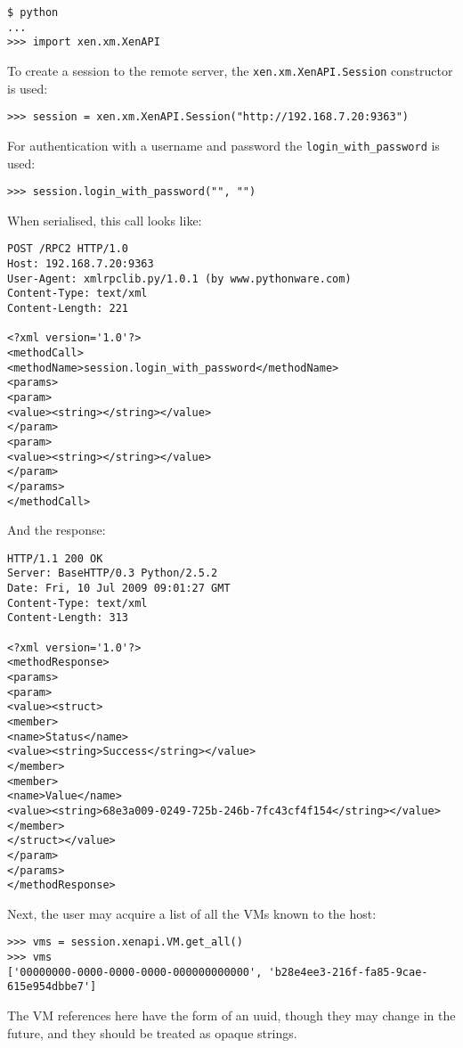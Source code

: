 \begin{verbatim}
$ python
...
>>> import xen.xm.XenAPI
\end{verbatim}

To create a session to the remote server, the
\texttt{xen.xm.XenAPI.Session} constructor is used:
\begin{verbatim}
>>> session = xen.xm.XenAPI.Session("http://192.168.7.20:9363")
\end{verbatim}

For authentication with a username and password the
\texttt{login\_with\_password} is used:
\begin{verbatim}
>>> session.login_with_password("", "")
\end{verbatim}

When serialised, this call looks like:
\begin{verbatim}
POST /RPC2 HTTP/1.0
Host: 192.168.7.20:9363
User-Agent: xmlrpclib.py/1.0.1 (by www.pythonware.com)
Content-Type: text/xml
Content-Length: 221

<?xml version='1.0'?>
<methodCall>
<methodName>session.login_with_password</methodName>
<params>
<param>
<value><string></string></value>
</param>
<param>
<value><string></string></value>
</param>
</params>
</methodCall>
\end{verbatim}

And the response:
\begin{verbatim}
HTTP/1.1 200 OK
Server: BaseHTTP/0.3 Python/2.5.2
Date: Fri, 10 Jul 2009 09:01:27 GMT
Content-Type: text/xml
Content-Length: 313

<?xml version='1.0'?>
<methodResponse>
<params>
<param>
<value><struct>
<member>
<name>Status</name>
<value><string>Success</string></value>
</member>
<member>
<name>Value</name>
<value><string>68e3a009-0249-725b-246b-7fc43cf4f154</string></value>
</member>
</struct></value>
</param>
</params>
</methodResponse>
\end{verbatim}

Next, the user may acquire a list of all the VMs known to the host:

\begin{verbatim}
>>> vms = session.xenapi.VM.get_all()
>>> vms
['00000000-0000-0000-0000-000000000000', 'b28e4ee3-216f-fa85-9cae-615e954dbbe7']
\end{verbatim}

The VM references here have the form of an uuid, though they may
change in the future, and they should be treated as opaque strings.

